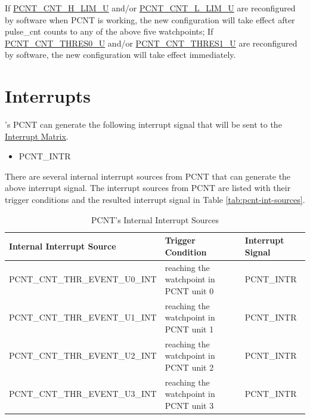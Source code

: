 \documentclass[main\_\_EN.tex]{subfiles}
\begin{document}
If \hyperref[fielddesc:PCNTCNTHLIMUN]{PCNT\_CNT\_H\_LIM\_U} and/or \hyperref[fielddesc:PCNTCNTLLIMUN]{PCNT\_CNT\_L\_LIM\_U} are reconfigured by software when PCNT is working, the new configuration will take effect after pulse\_cnt counts to any of the above five watchpoints; If \hyperref[fielddesc:PCNTCNTTHRES0UN]{PCNT\_CNT\_THRES0\_U} and/or \hyperref[fielddesc:PCNTCNTTHRES1UN]{PCNT\_CNT\_THRES1\_U} are reconfigured by software, the new configuration will take effect immediately.



\section{Interrupts}

\chipname{}'s PCNT can generate the following interrupt signal that will be sent to the \hyperref[mod:intmtrx]{Interrupt Matrix}.

    \begin{itemize}
        \item PCNT\_INTR
    \end{itemize}

There are several internal interrupt sources from PCNT that can generate the above interrupt signal. The interrupt sources from PCNT are listed with their trigger conditions and the resulted interrupt signal in Table \ref{tab:pcnt-int-sources}.

\begin{longtable}{ | L{5cm} | L{6.5cm} | L{4cm} | }
\caption{PCNT's Internal Interrupt Sources}
\label{tab:pcnt-int-sources}
\\ \hline
{}
\textbf{Internal Interrupt Source} & \textbf{Trigger Condition}  &  \textbf{Interrupt Signal}\\ \hline
\label{int:PCNTCNTTHREVENTU0INT}PCNT\_CNT\_THR\_EVENT\_U0\_INT & reaching the watchpoint in PCNT unit 0 & PCNT\_INTR \\ \hline
\label{int:PCNTCNTTHREVENTU1INT}PCNT\_CNT\_THR\_EVENT\_U1\_INT & reaching the watchpoint in PCNT unit 1 & PCNT\_INTR \\ \hline
\label{int:PCNTCNTTHREVENTU2INT}PCNT\_CNT\_THR\_EVENT\_U2\_INT & reaching the watchpoint in PCNT unit 2 & PCNT\_INTR \\ \hline
\label{int:PCNTCNTTHREVENTU3INT}PCNT\_CNT\_THR\_EVENT\_U3\_INT & reaching the watchpoint in PCNT unit 3 & PCNT\_INTR \\ \hline
\end{longtable}
\end{document}
